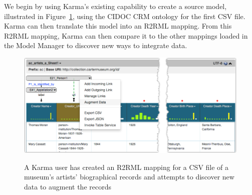 We begin by using Karma's existing capability to create a source model, illustrated in Figure~\ref{fig:simple-model-screenshot}, using the CIDOC CRM ontology for the first CSV file.  
Karma can then translate this model into an R2RML mapping.
From this R2RML mapping, Karma can then compare it to the other mappings loaded in the Model Manager to discover new ways to integrate data.


\begin{figure}
\begin{center}
\includegraphics[width=4.8in]{images/4-simple-model.png}
\vspace{-3mm}
\caption{A Karma user has created an R2RML mapping for a CSV file of a museum's artists' biographical records and attempts to discover new data to augment the records}
\vspace{-2mm}
\label{fig:simple-model-screenshot}
\end{center}
\vspace{-1.5em}
\end{figure}
